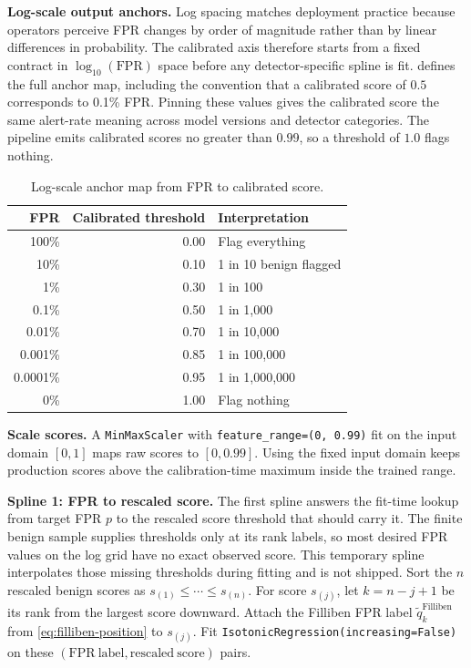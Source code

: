 \documentclass{article}
\begin{document}
\textbf{Log-scale output anchors.}
Log spacing matches deployment practice because operators perceive FPR changes by order of magnitude rather than by linear differences in probability.
The calibrated axis therefore starts from a fixed contract in $\log_{10}(\mathrm{FPR})$ space before any detector-specific spline is fit.
 defines the full anchor map, including the convention that a calibrated score of $0.5$ corresponds to 0.1\% FPR.
Pinning these values gives the calibrated score the same alert-rate meaning across model versions and detector categories.
The pipeline emits calibrated scores no greater than $0.99$, so a threshold of $1.0$ flags nothing.

\begin{table}[!htb]
  \centering
  \caption{Log-scale anchor map from FPR to calibrated score.}
  \label{tab:anchors}
  \begin{tabular}{rrl}
    \toprule
    FPR & Calibrated threshold & Interpretation \\
    \midrule
    100\%    & 0.00 & Flag everything \\
    10\%     & 0.10 & 1 in 10 benign flagged \\
    1\%      & 0.30 & 1 in 100 \\
    0.1\%    & 0.50 & 1 in 1{,}000 \\
    0.01\%   & 0.70 & 1 in 10{,}000 \\
    0.001\%  & 0.85 & 1 in 100{,}000 \\
    0.0001\% & 0.95 & 1 in 1{,}000{,}000 \\
    0\%      & 1.00 & Flag nothing \\
    \bottomrule
  \end{tabular}
\end{table}

\textbf{Scale scores.}
A \texttt{MinMaxScaler} with \texttt{feature\_range=(0, 0.99)} fit on the input domain $[0, 1]$ maps raw scores to $[0, 0.99]$.
Using the fixed input domain keeps production scores above the calibration-time maximum inside the trained range.

\textbf{Spline 1: FPR to rescaled score.}
The first spline answers the fit-time lookup from target FPR $p$ to the rescaled score threshold that should carry it.
The finite benign sample supplies thresholds only at its rank labels, so most desired FPR values on the log grid have no exact observed score.
This temporary spline interpolates those missing thresholds during fitting and is not shipped.
Sort the $n$ rescaled benign scores as $s_{(1)}\le\cdots\le s_{(n)}$.
For score $s_{(j)}$, let $k=n-j+1$ be its rank from the largest score downward.
Attach the Filliben FPR label $\widetilde q_k^{\mathrm{Filliben}}$ from \cref{eq:filliben-position} to $s_{(j)}$.
Fit \texttt{IsotonicRegression(increasing=False)} on these $(\mathrm{FPR\ label}, \mathrm{rescaled\ score})$ pairs.
\end{document}
